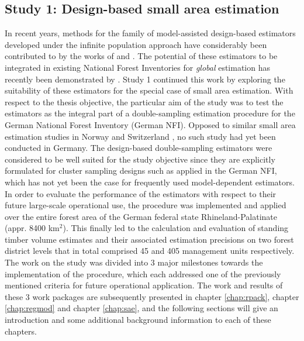 \subsection{Study 1: Design-based small area estimation}
\label{sec:study1}


In recent years, methods for the family of model-assisted design-based estimators developed under the infinite population approach have considerably been contributed to by the works of \citet{mandallaz1991, mandallaz2008, mandallaz2013a, mandallaz2013c} and \citet{mandallaz2013b}. The potential of these estimators to be integrated in existing National Forest Inventories for \textit{global} estimation has recently been demonstrated by \citet{massey2015_thesis}. Study 1 continued this work by exploring the suitability of these estimators for the special case of small area estimation. With respect to the thesis objective, the particular aim of the study was to test the estimators as the integral part of a double-sampling estimation procedure for the German National Forest Inventory (German NFI). Opposed to similar small area estimation studies in Norway \citep{breidenbach2012} and Switzerland \citep{magnussen2014a, steinmann2013}, no such study had yet been conducted in Germany. The design-based double-sampling estimators were considered to be well suited for the study objective since they are explicitly formulated for cluster sampling designs such as applied in the German NFI, which has not yet been the case for frequently used model-dependent estimators. In order to evaluate the performance of the estimators with respect to their future large-scale operational use, the procedure was implemented and applied over the entire forest area of the German federal state Rhineland-Palatinate (appr. 8400 km$^2$). This finally led to the calculation and evaluation of standing timber volume estimates and their associated estimation precisions on two forest district levels that in total comprised 45 and 405 management units respectively. The work on the study was divided into 3 major milestones towards the implementation of the procedure, which each addressed one of the previously mentioned criteria for future operational application. The work and results of these 3 work packages are subsequently presented in chapter \ref{chap:rpack}, chapter \ref{chap:regmod} and chapter \ref{chap:sae}, and the following sections will give an introduction and some additional background information to each of these chapters.


